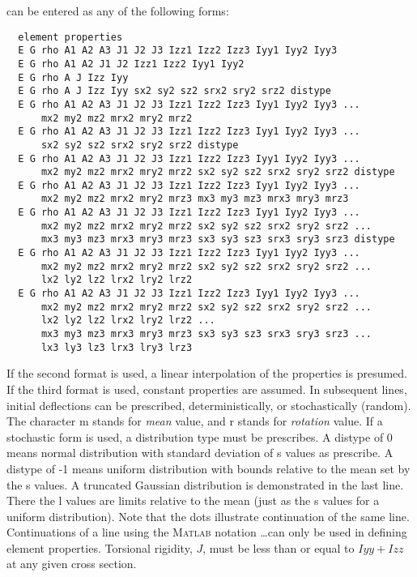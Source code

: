 \documentclass[12pt]{article}
\newcommand*{\command}[1]{\textsf{#1}}
\begin{document}
can be entered as any of the following forms:
\begin{lstlisting}
  element properties 
  E G rho A1 A2 A3 J1 J2 J3 Izz1 Izz2 Izz3 Iyy1 Iyy2 Iyy3 
  E G rho A1 A2 J1 J2 Izz1 Izz2 Iyy1 Iyy2 
  E G rho A J Izz Iyy 
  E G rho A J Izz Iyy sx2 sy2 sz2 srx2 sry2 srz2 distype 
  E G rho A1 A2 A3 J1 J2 J3 Izz1 Izz2 Izz3 Iyy1 Iyy2 Iyy3 ...  
      mx2 my2 mz2 mrx2 mry2 mrz2 
  E G rho A1 A2 A3 J1 J2 J3 Izz1 Izz2 Izz3 Iyy1 Iyy2 Iyy3 ...  
      sx2 sy2 sz2 srx2 sry2 srz2 distype 
  E G rho A1 A2 A3 J1 J2 J3 Izz1 Izz2 Izz3 Iyy1 Iyy2 Iyy3 ...  
      mx2 my2 mz2 mrx2 mry2 mrz2 sx2 sy2 sz2 srx2 sry2 srz2 distype 
  E G rho A1 A2 A3 J1 J2 J3 Izz1 Izz2 Izz3 Iyy1 Iyy2 Iyy3 ...
      mx2 my2 mz2 mrx2 mry2 mrz3 mx3 my3 mz3 mrx3 mry3 mrz3 
  E G rho A1 A2 A3 J1 J2 J3 Izz1 Izz2 Izz3 Iyy1 Iyy2 Iyy3 ...
      mx2 my2 mz2 mrx2 mry2 mrz2 sx2 sy2 sz2 srx2 sry2 srz2 ...  
      mx3 my3 mz3 mrx3 mry3 mrz3 sx3 sy3 sz3 srx3 sry3 srz3 distype
  E G rho A1 A2 A3 J1 J2 J3 Izz1 Izz2 Izz3 Iyy1 Iyy2 Iyy3 ...
      mx2 my2 mz2 mrx2 mry2 mrz2 sx2 sy2 sz2 srx2 sry2 srz2 ...  
      lx2 ly2 lz2 lrx2 lry2 lrz2 
  E G rho A1 A2 A3 J1 J2 J3 Izz1 Izz2 Izz3 Iyy1 Iyy2 Iyy3 ...
      mx2 my2 mz2 mrx2 mry2 mrz2 sx2 sy2 sz2 srx2 sry2 srz2 ...  
      lx2 ly2 lz2 lrx2 lry2 lrz2 ...  
      mx3 my3 mz3 mrx3 mry3 mrz3 sx3 sy3 sz3 srx3 sry3 srz3 ...
      lx3 ly3 lz3 lrx3 lry3 lrz3 
\end{lstlisting}
If the second format is used, a linear interpolation of the properties is presumed. If the third format is used, constant properties are assumed. In subsequent lines, initial deflections can be prescribed, deterministically, or stochastically (random). The character \command{m} stands for \emph{mean} value, and \command{r} stands for \emph{rotation} value. If a stochastic form is used, a distribution type must be prescribes. A \command{distype} of \command{0} means normal distribution with standard deviation of \command{s} values as prescribe. A \command{distype} of \command{-1} means uniform distribution with bounds relative to the mean set by the \command{s} values. A truncated Gaussian distribution is demonstrated in the last line. There the \command{l} values are limits relative to the mean (just as the \command{s} values for a uniform distribution). Note that the dots illustrate continuation of the same line. Continuations of a line using the M\textsc{atlab} notation \ldots can only be used in defining element properties. Torsional rigidity, $J$, must be less than or equal to $Iyy+Izz$ at any given cross section. 
\end{document}

